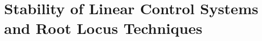\documentclass[../course]{subfiles}
\begin{document}
\chapter{Stability of Linear Control Systems and Root Locus Techniques}


\end{document}
